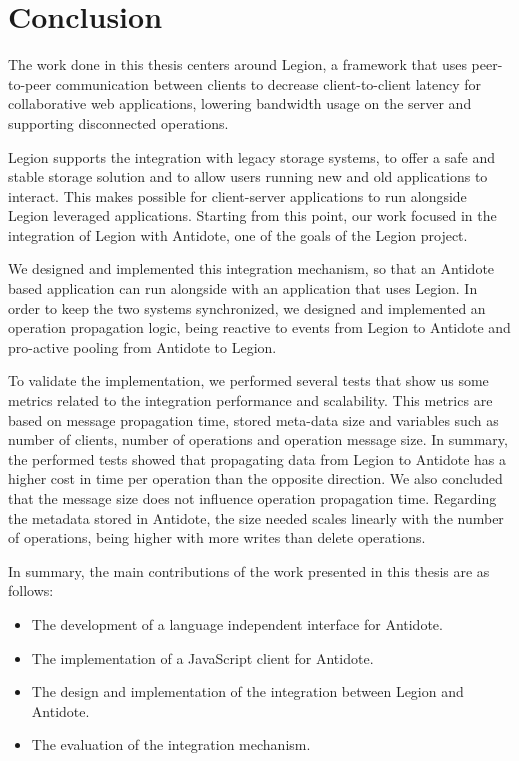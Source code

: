 \chapter{Conclusion}
\label{cha:conclusion}
The work done in this thesis centers around Legion, a framework that uses peer-to-peer communication between clients to decrease client-to-client latency for collaborative web applications, lowering bandwidth usage on the server and supporting disconnected operations.\par
	Legion supports the integration with legacy storage systems, to offer a safe and stable storage solution and to allow users running new and old applications to interact. This makes possible for client-server applications to run alongside Legion leveraged applications. Starting from this point, our work focused in the integration of Legion with Antidote, one of the goals of the Legion project.\par
	We designed and implemented this integration mechanism, so that an Antidote based application can run alongside with an application that uses Legion. In order to keep the two systems synchronized, we designed and implemented an operation propagation logic, being reactive to events from Legion to Antidote and pro-active pooling from Antidote to Legion.\par
	To validate the implementation, we performed several tests that show us some metrics related to the integration performance and scalability. This metrics are based on message propagation time, stored meta-data size and variables such as number of clients, number of operations and operation message size. In summary, the performed tests showed that propagating data from Legion to Antidote has a higher cost in time per operation than the opposite direction. We also concluded that the message size does not influence operation propagation time. Regarding the metadata stored in Antidote, the size needed scales linearly with the number of operations, being higher with more writes than delete operations.\par
In summary, the main contributions of the work presented in this thesis are as follows:

\begin{itemize}
\item The development of a language independent interface for Antidote.
\item The implementation of a JavaScript client for Antidote.
\item The design and implementation of the integration between Legion and Antidote.
\item The evaluation of the integration mechanism.
\end{itemize}

